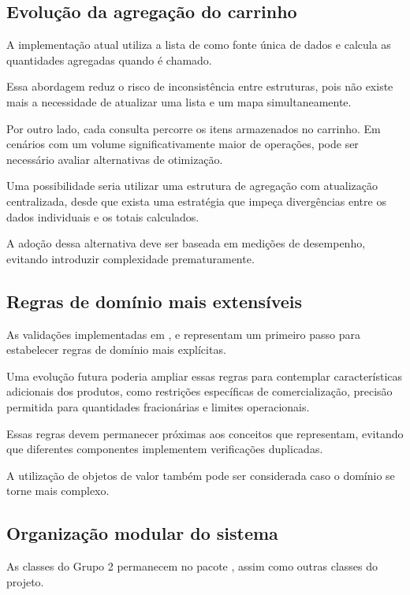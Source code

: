 \subsection{Evolução da agregação do carrinho}

A implementação atual utiliza a lista de  como fonte única de dados e calcula as quantidades agregadas quando  é chamado.

Essa abordagem reduz o risco de inconsistência entre estruturas, pois não existe mais a necessidade de atualizar uma lista e um mapa simultaneamente.

Por outro lado, cada consulta percorre os itens armazenados no carrinho. Em cenários com um volume significativamente maior de operações, pode ser necessário avaliar alternativas de otimização.

Uma possibilidade seria utilizar uma estrutura de agregação com atualização centralizada, desde que exista uma estratégia que impeça divergências entre os dados individuais e os totais calculados.

A adoção dessa alternativa deve ser baseada em medições de desempenho, evitando introduzir complexidade prematuramente.

\subsection{Regras de domínio mais extensíveis}

As validações implementadas em ,  e  representam um primeiro passo para estabelecer regras de domínio mais explícitas.

Uma evolução futura poderia ampliar essas regras para contemplar características adicionais dos produtos, como restrições específicas de comercialização, precisão permitida para quantidades fracionárias e limites operacionais.

Essas regras devem permanecer próximas aos conceitos que representam, evitando que diferentes componentes implementem verificações duplicadas.

A utilização de objetos de valor também pode ser considerada caso o domínio se torne mais complexo.

\subsection{Organização modular do sistema}

As classes do Grupo 2 permanecem no pacote , assim como outras classes do projeto.

